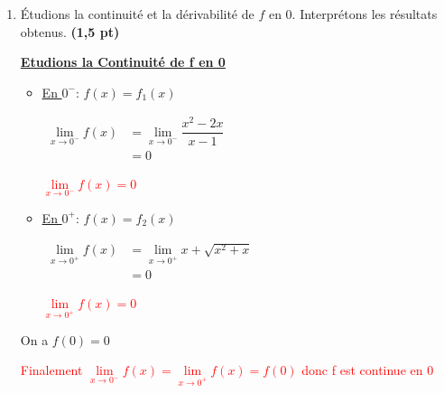 \documentclass[12pt,a4paper]{article}
\begin{document}
\begin{enumerate}
\begin{itemize}
\textcolor{red}{{\underline{$\lim\limits_{x \to -\infty} f(x) = -\infty$}}} \hspace{1cm} \textbf{(0,25 pt)}

\item \underline{En $+\infty$}: $f(x)=f_{2}(x)$   
    
\(
\begin{aligned}
 \lim\limits_{x \to +\infty} f(x) &= \lim\limits_{x \to +\infty} x + \sqrt{x^2+x}\\
 																	&= \lim\limits_{x \to +\infty} x + \sqrt{x^2+x}\\
 																	&= +\infty
\end{aligned}    
\)

\textcolor{red}{{\underline{$\lim\limits_{x \to +\infty} f(x) = +\infty$}}} \hspace{1cm} \textbf{(0,25 pt)}
\end{itemize}

    \item Étudions la continuité et la dérivabilité de $f$ en $0$. Interprétons les résultats obtenus. \hspace{1cm} \textbf{(1,5 pt)}

\underline{\textbf{Etudions la Continuité de f en 0  } } 

 \begin{itemize}
\item \underline{En $0^-$}: $f(x)=f_{1}(x)$   
    
\(
\begin{aligned}
 \lim\limits_{x \to 0^-} f(x) &= \lim\limits_{x \to 0^-} \dfrac{x^2-2x}{x-1}\\
 															&= 0
\end{aligned}    
\)

\textcolor{red}{{\underline{$\lim\limits_{x \to 0^-} f(x) = 0$}}}

\item \underline{En $0^+$}: $f(x)=f_{2}(x)$   
    
\(
\begin{aligned}
 \lim\limits_{x \to 0^+} f(x) &= \lim\limits_{x \to 0^+} x + \sqrt{x^2+x}\\
															&=0
\end{aligned}    
\)

\textcolor{red}{{\underline{$\lim\limits_{x \to 0^+} f(x) = 0$}}}
\end{itemize}   

On a $f(0)=0$

\textcolor{red}{Finalement $\lim\limits_{x \to 0^-} f(x) = \lim\limits_{x \to 0^+} f(x) = f(0)$ donc f est continue en $0$}


\end{enumerate}
\end{document}

